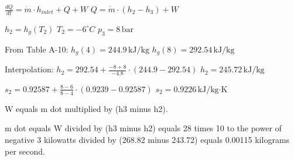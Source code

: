 \( \frac{dQ}{dt} = \dot{m} \cdot h_{inlet} + Q + W \)  
\( Q = \dot{m} \cdot (h_2 - h_3) + W \)  

\( h_2 = h_{g}(T_2) \)  
\( T_2 = -6^\circ C \)  
\( p_3 = 8 \, \text{bar} \)  

From Table A-10:  
\( h_{g}(4) = 244.9 \, \text{kJ/kg} \)  
\( h_{g}(8) = 292.54 \, \text{kJ/kg} \)  

Interpolation:  
\( h_2 = 292.54 + \frac{-8 + 8}{-4.8} \cdot (244.9 - 292.54) \)  
\( h_2 = 245.72 \, \text{kJ/kg} \)  

\( s_2 = 0.92587 + \frac{8 - 6}{8 - 4} \cdot (0.9239 - 0.92587) \)  
\( s_2 = 0.9226 \, \text{kJ/kg·K} \)

W equals m dot multiplied by (h3 minus h2).  

m dot equals W divided by (h3 minus h2) equals 28 times 10 to the power of negative 3 kilowatts divided by (268.82 minus 243.72) equals 0.00115 kilograms per second.